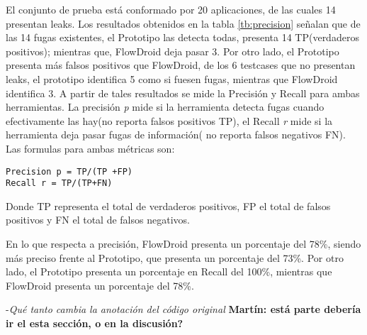 El conjunto de prueba está conformado por 20 aplicaciones, de las cuales 14
presentan leaks.
Los resultados obtenidos en la tabla \ref{tb:precision} señalan que de las 14
fugas existentes, el Prototipo las detecta todas, presenta 14 TP(verdaderos
positivos); mientras que, FlowDroid deja pasar 3.\newline
Por otro lado, el Prototipo presenta más falsos positivos que FlowDroid, de los
6 testcases que no presentan leaks, el prototipo identifica 5 como si fuesen
fugas, mientras que FlowDroid identifica 3.\newline
A partir de tales resultados se mide la Precisión y Recall para ambas
herramientas. La precisión \textit{p} mide si la herramienta detecta fugas
cuando efectivamente las hay(no reporta falsos positivos TP), el Recall
\textit{r} mide si la herramienta deja pasar fugas de información( no reporta
falsos negativos FN).
Las formulas para ambas métricas son:
\begin{lstlisting}
Precision p = TP/(TP +FP)
Recall r = TP/(TP+FN) 
\end{lstlisting} 
Donde TP representa el total de verdaderos positivos, FP el
total de falsos positivos y  FN el total de falsos negativos.\newline

En lo que respecta a precisión, FlowDroid presenta un porcentaje del 78\%,
siendo más preciso frente al Prototipo, que presenta un porcentaje del
73\%.\newline 
Por otro lado, el Prototipo presenta un porcentaje en Recall del 100\%,
mientras que FlowDroid presenta un porcentaje del 78\%.


-\textit{Qué tanto cambia la anotación del código original}
\textbf{Martín: está parte debería ir el esta sección, o en la discusión?}

























